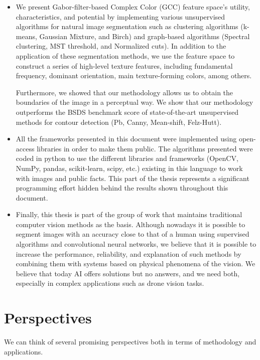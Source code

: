 \begin{itemize}
	\item We present Gabor-filter-based Complex Color (GCC) feature space's utility, characteristics, and potential by implementing various unsupervised algorithms for natural image segmentation such as clustering algorithms (k-means, Gaussian Mixture, and Birch) and graph-based algorithms (Spectral clustering, MST threshold, and Normalized cuts). In addition to the application of these segmentation methods, we use the feature space to construct a series of high-level texture features, including fundamental frequency, dominant orientation, main texture-forming colors, among others. 

Furthermore, we showed that our methodology allows us to obtain the boundaries of the image in a perceptual way. We show that our methodology outperforms the BSDS benchmark score of state-of-the-art unsupervised methods for contour detection (Pb, Canny, Mean-shift, Felz-Hutt).
	
	\item All the frameworks presented in this document were implemented using open-access libraries in order to make them public. The algorithms presented were coded in python to use the different libraries and frameworks (OpenCV, NumPy, pandas, scikit-learn, scipy, etc.) existing in this language to work with images and public facts. This part of the thesis represents a significant programming effort hidden behind the results shown throughout this document.
	
	\item Finally, this thesis is part of the group of work that maintains traditional computer vision methods as the basis. Although nowadays it is possible to segment images with an accuracy close to that of a human using supervised algorithms and convolutional neural networks, we believe that it is possible to increase the performance, reliability, and explanation of such methods by combining them with systems based on physical phenomena of the vision. We believe that today AI offers solutions but no answers, and we need both, especially in complex applications such as drone vision tasks.	
	
\end{itemize}


\section*{Perspectives}

We can think of several promising perspectives both in terms of methodology and applications.

